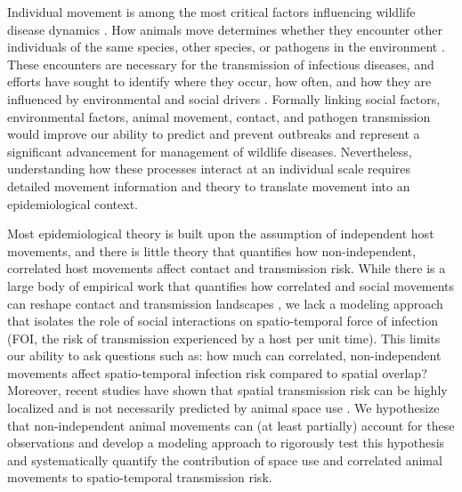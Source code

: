 \documentclass[letterpaper]{article}
\begin{document}
Individual movement is among the most critical factors influencing wildlife disease dynamics \citep{Dougherty2018,Manlove2022}. 
How animals move determines whether they encounter other individuals of the same species, other species, or pathogens in the environment \citep{Martinez-Garcia2020,Das2023}. 
These encounters are necessary for the transmission of infectious diseases, and efforts have sought to identify where they occur, how often, and how they are influenced by environmental and social drivers \citep{Titcomb2021,Dougherty2022,Webber2023}. 
Formally linking social factors, environmental factors, animal movement, contact, and pathogen transmission would improve our ability to predict and prevent outbreaks and represent a significant advancement for management of wildlife diseases.  
Nevertheless, understanding how these processes interact at an individual scale requires detailed movement information and theory to translate movement into an epidemiological context.


Most epidemiological theory is built upon the assumption of independent host movements, and there is little theory that quantifies how non-independent, correlated host movements affect contact and transmission risk. While there is a large body of empirical work that quantifies how correlated and social movements can reshape contact and transmission landscapes \citep[e.g.,][]{Kjaer2008,Grear2010,Schauber2015a}, we lack a modeling approach that isolates the role of social interactions on spatio-temporal force of infection (FOI, the risk of transmission experienced by a host per unit time). This limits our ability to ask questions such as: how much can correlated, non-independent movements affect spatio-temporal infection risk compared to spatial overlap? Moreover, recent studies have shown that spatial transmission risk can be highly localized \citep{Albery2021} and is not necessarily predicted by animal space use \citep{Yang2023a}. We hypothesize that non-independent animal movements can (at least partially) account for these observations and develop a modeling approach to rigorously test this hypothesis and systematically quantify the contribution of space use and correlated animal movements to spatio-temporal transmission risk.
\end{document}
